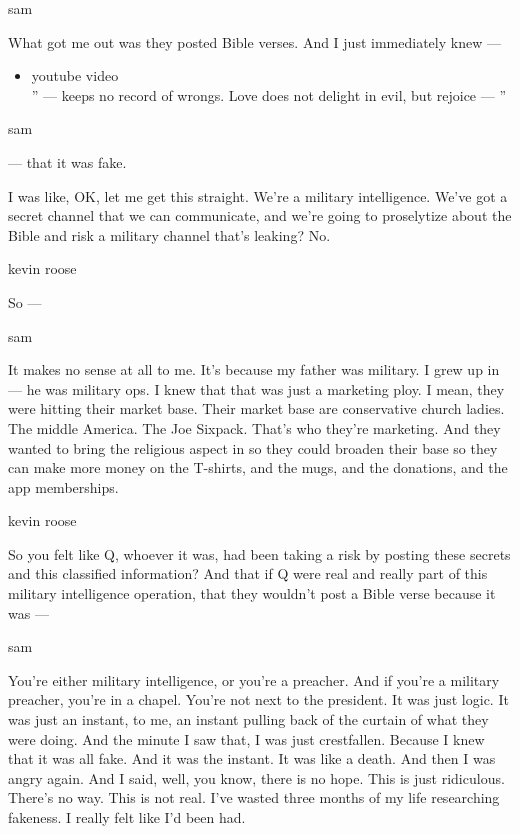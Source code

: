 sam

What got me out was they posted Bible verses. And I just immediately
knew ---

\begin{itemize}
\tightlist
\item
  youtube video\\
  '' --- keeps no record of wrongs. Love does not delight in evil, but
  rejoice --- ''
\end{itemize}

sam

--- that it was fake.

I was like, OK, let me get this straight. We're a military intelligence.
We've got a secret channel that we can communicate, and we're going to
proselytize about the Bible and risk a military channel that's leaking?
No.

kevin roose

So ---

sam

It makes no sense at all to me. It's because my father was military. I
grew up in --- he was military ops. I knew that that was just a
marketing ploy. I mean, they were hitting their market base. Their
market base are conservative church ladies. The middle America. The Joe
Sixpack. That's who they're marketing. And they wanted to bring the
religious aspect in so they could broaden their base so they can make
more money on the T-shirts, and the mugs, and the donations, and the app
memberships.

kevin roose

So you felt like Q, whoever it was, had been taking a risk by posting
these secrets and this classified information? And that if Q were real
and really part of this military intelligence operation, that they
wouldn't post a Bible verse because it was ---

sam

You're either military intelligence, or you're a preacher. And if you're
a military preacher, you're in a chapel. You're not next to the
president. It was just logic. It was just an instant, to me, an instant
pulling back of the curtain of what they were doing. And the minute I
saw that, I was just crestfallen. Because I knew that it was all fake.
And it was the instant. It was like a death. And then I was angry again.
And I said, well, you know, there is no hope. This is just ridiculous.
There's no way. This is not real. I've wasted three months of my life
researching fakeness. I really felt like I'd been had.

